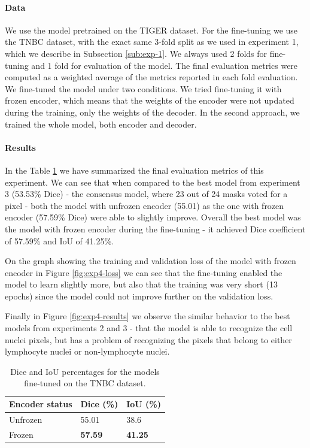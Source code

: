 \paragraph{Data}
We use the model pretrained on the TIGER dataset. For the fine-tuning we use the TNBC dataset, with the exact same 3-fold split as we used in experiment 1, which we describe in Subsection \ref{sub:exp-1}. We always used 2 folds for fine-tuning and 1 fold for evaluation of the model. The final evaluation metrics were computed as a weighted average of the metrics reported in each fold evaluation. We fine-tuned the model under two conditions. We tried fine-tuning it with frozen encoder, which means that the weights of the encoder were not updated during the training, only the weights of the decoder. In the second approach, we trained the whole model, both encoder and decoder.

\paragraph{Results}
In the Table \ref{tab:transfer} we have summarized the final evaluation metrics of this experiment. We can see that when compared to the best model from experiment 3 (53.53\% Dice) - the consensus model, where 23 out of 24 masks voted for a pixel - both the model with unfrozen encoder (55.01) as the one with frozen encoder (57.59\% Dice) were able to slightly improve. Overall the best model was the model with frozen encoder during the fine-tuning - it achieved Dice coefficient of 57.59\% and IoU of 41.25\%.

On the graph showing the training and validation loss of the model with frozen encoder in Figure \ref{fig:exp4-loss} we can see that the fine-tuning enabled the model to learn slightly more, but also that the training was very short (13 epochs) since the model could not improve further on the validation loss.

Finally in Figure \ref{fig:exp4-results} we observe the similar behavior to the best models from experiments 2 and 3 - that the model is able to recognize the cell nuclei pixels, but has a problem of recognizing the pixels that belong to either lymphocyte nuclei or non-lymphocyte nuclei.

\begin{table}[H]
  \centering
  \begin{tabular}{ p{5cm} | p{3cm} | p{3cm} } 
    \hline
    \textbf{Encoder status} & \textbf{Dice (\%)} & \textbf{IoU (\%)} \\
    \hline
      Unfrozen & 55.01 & 38.6 \\
      Frozen   & \textbf{57.59} & \textbf{41.25} \\
    \hline
  \end{tabular}
  \caption{Dice and IoU percentages for the models fine-tuned on the TNBC dataset.}
  \label{tab:transfer}
\end{table}

